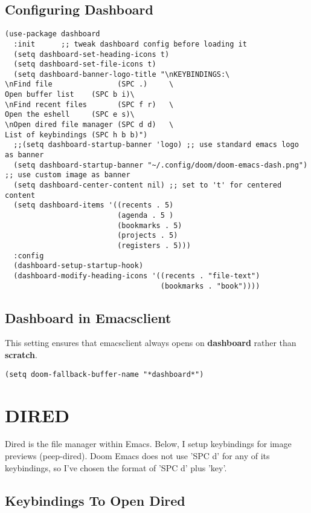 \documentclass[11pt]{article}
\begin{document}
\subsection{Configuring Dashboard}
\label{sec:org07ea0d6}
\begin{verbatim}
(use-package dashboard
  :init      ;; tweak dashboard config before loading it
  (setq dashboard-set-heading-icons t)
  (setq dashboard-set-file-icons t)
  (setq dashboard-banner-logo-title "\nKEYBINDINGS:\
\nFind file               (SPC .)     \
Open buffer list    (SPC b i)\
\nFind recent files       (SPC f r)   \
Open the eshell     (SPC e s)\
\nOpen dired file manager (SPC d d)   \
List of keybindings (SPC h b b)")
  ;;(setq dashboard-startup-banner 'logo) ;; use standard emacs logo as banner
  (setq dashboard-startup-banner "~/.config/doom/doom-emacs-dash.png")  ;; use custom image as banner
  (setq dashboard-center-content nil) ;; set to 't' for centered content
  (setq dashboard-items '((recents . 5)
                          (agenda . 5 )
                          (bookmarks . 5)
                          (projects . 5)
                          (registers . 5)))
  :config
  (dashboard-setup-startup-hook)
  (dashboard-modify-heading-icons '((recents . "file-text")
                                    (bookmarks . "book"))))
\end{verbatim}

\subsection{Dashboard in Emacsclient}
\label{sec:org7e30b08}
This setting ensures that emacsclient always opens on \textbf{dashboard} rather than \textbf{scratch}.
\begin{verbatim}
(setq doom-fallback-buffer-name "*dashboard*")
\end{verbatim}

\section{DIRED}
\label{sec:org4653bcb}
Dired is the file manager within Emacs.  Below, I setup keybindings for image previews (peep-dired).  Doom Emacs does not use 'SPC d' for any of its keybindings, so I've chosen the format of 'SPC d' plus 'key'.

\subsection{Keybindings To Open Dired}
\label{sec:org12e94b7}
\end{document}
